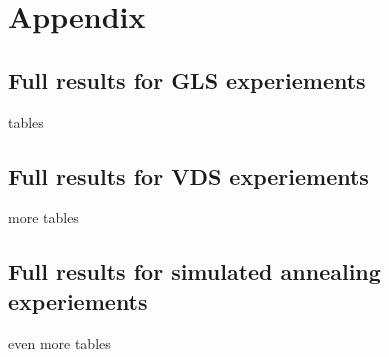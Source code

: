 \documentclass[12pt,a4paper,reqno]{article}
\begin{document}
\newpage

\section{Appendix}
\subsection*{Full results for GLS experiements}
tables

\subsection*{Full results for VDS experiements}
more tables

\subsection*{Full results for simulated annealing experiements}
even more tables
\end{document}
